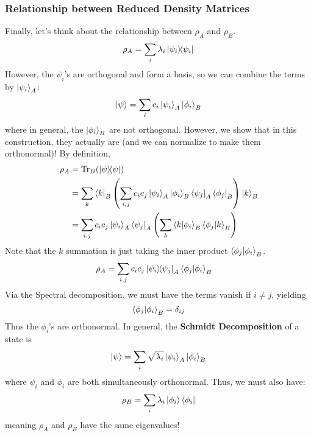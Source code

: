 \subsubsection{Relationship between Reduced Density Matrices}
Finally, let's think about the relationship between $\rho_A$ and $\rho_B$.
\[ \rho_A = \sum_i \lambda_i \ketbra{\psi_i}{\psi_i} \]
However, the $\psi_i$'s are orthogonal and form a basis, so we can combine the terms by $\ket{\psi_i}_A$:
\[ \ket{\psi} = \sum_i c_i \ket{\psi_i}_{A} \ket{\phi_i}_B \]
where in general, the $\ket{\phi_i}_B$ are not orthogonal. However, we show that in this construction, they actually are (and we can normalize to make them orthonormal)! %
By definition,
\begin{align*}
    \rho_A &= \Tr_B(\ketbra{\psi}{\psi}) \\
    &= \sum_k \bra{k}_B \qty(\sum_{i,j} c_i c_j \ket{\psi_i}_A \ket{\phi_i}_B \bra{\psi_j}_A \bra{\phi_j}_B) \ket{k}_B \\
    &= \sum_{i,j} c_i c_j \ket{\psi_i}_A \bra{\psi_j}_A \qty(\sum_k  \braket{k}{\phi_i}_B \braket{\phi_j}{k}_B)
\end{align*}
Note that the $k$ summation is just taking the inner product $\braket{\phi_j}{\phi_i}_B$.
\begin{align*}
    \rho_A &= \sum_{i, j}  c_i c_j \ketbra{\psi_i}{\psi_j}_A \braket{\phi_j}{\phi_i}_B
\end{align*}
Via the Spectral decomposition, we must have the terms vanish if $i \neq j$, yielding
\[ \braket{\phi_j}{\phi_i}_B = \delta_{ij} \]
Thus the $\phi_i$'s are orthonormal. In general, the \textbf{Schmidt Decomposition} of a state is
\[ \ket{\psi} = \sum_i \sqrt{\lambda_i} \ket{\psi_i}_A \ket{\phi_i}_B \]
where $\psi_i$ and $\phi_i$ are both simultaneously orthonormal. Thus, we must also have:
\[ \rho_B = \sum_i \lambda_i \ket{\phi_i}\bra{\phi_i} \]
meaning $\rho_A$ and $\rho_B$ have the same eigenvalues!
